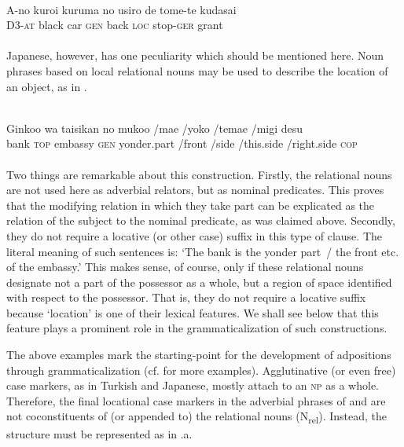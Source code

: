\ea\label{ex:E51}
 \\
\gll A-no  kuroi  kuruma  no  usiro  de  tome-te  kudasai\\
D3-\textsc{at}  black  car  \textsc{gen}  back  \textsc{loc}  stop-\textsc{ger}  grant\\
\\
\z
\noindent Japanese, however, has one peculiarity which should be mentioned here. Noun phrases based on local relational nouns may be used to describe the location of an object, as in .

\ea\label{ex:E52}
 \\
\gll  Ginkoo  wa  taisikan  no  mukoo  /mae  /yoko  /temae  /migi  desu\\
bank  \textsc{top}  embassy  \textsc{gen}  yonder.part  /front  /side  /this.side  /right.side  \textsc{cop}\\
\\
\z
\noindent Two things are remarkable about this construction. Firstly, the relational nouns are not used here as adverbial relators, but as nominal predicates. This proves that the modifying relation in which they take part can be explicated as the relation of the subject to the nominal predicate, as was claimed above. Secondly, they do not require a locative (or other case) suffix in this type of clause. The literal meaning of such sentences is: ‘The bank is the yonder part~/ the front etc. of the embassy.’ This makes sense, of course, only if these relational nouns designate not a part of the possessor as a whole, but a region of space identified with respect to the possessor. That is, they do not require a locative suffix because ‘location’ is one of their lexical features. We shall see below that this feature plays a prominent role in the grammaticalization of such constructions.

The above examples mark the starting-point for the development of adpositions through grammaticalization (cf. \citealt[446, Fn 5]{MallinsonEtAl1981} for more examples). Agglutinative (or even free) case markers, as in Turkish and Japanese, mostly attach to an \textsc{np} as a whole. Therefore, the final locational case markers in the adverbial phrases of  and  are not coconstituents of (or appended to) the relational nouns (N\textsubscript{rel}). Instead, the structure must be represented as in .a.

